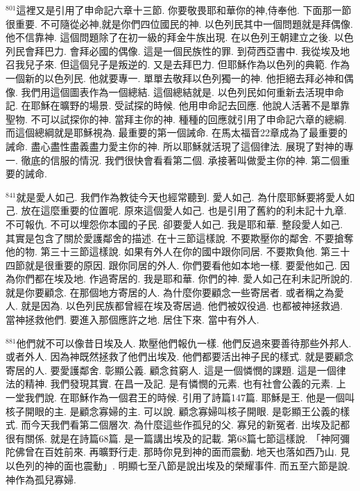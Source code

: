 \documentclass{book}
\begin{document}
$^{801}$這裡又是引用了申命記六章十三節.
你要敬畏耶和華你的神,侍奉他.
下面那一節很重要.
不可隨從必神,就是你們四位國民的神.
以色列民其中一個問題就是拜偶像.
他不信靠神.
這個問題除了在初一級的拜金牛族出現.
在以色列王朝建立之後.
以色列民會拜巴力.
會拜必國的偶像.
這是一個民族性的罪.
到荷西亞書中.
我從埃及地召我兒子來.
但這個兒子是叛逆的.
又是去拜巴力.
但耶穌作為以色列的典範.
作為一個新的以色列民.
他就要專一.
單單去敬拜以色列獨一的神.
他拒絕去拜必神和偶像.
我們用這個圖表作為一個總結.
這個總結就是.
以色列民如何重新去活現申命記.
在耶穌在曠野的場景.
受試探的時候.
他用申命記去回應.
他說人活著不是單靠聖物.
不可以試探你的神.
當拜主你的神.
種種的回應就引用了申命記六章的總綱.
而這個總綱就是耶穌視為.
最重要的第一個誡命.
在馬太福音22章成為了最重要的誡命.
盡心盡性盡義盡力愛主你的神.
所以耶穌就活現了這個律法.
展現了對神的專一.
徹底的信服的情況.
我們很快會看看第二個.
承接著叫做愛主你的神.
第二個重要的誡命.

$^{841}$就是愛人如己.
我們作為教徒今天也經常聽到.
愛人如己.
為什麼耶穌要將愛人如己.
放在這麼重要的位置呢.
原來這個愛人如己.
也是引用了舊約的利未記十九章.
不可報仇.
不可以埋怨你本國的子民.
卻要愛人如己.
我是耶和華.
整段愛人如己.
其實是包含了關於愛護鄰舍的描述.
在十三節這樣說.
不要欺壓你的鄰舍.
不要搶奪他的物.
第三十三節這樣說.
如果有外人在你的國中跟你同居.
不要欺負他.
第三十四節就是很重要的原因.
跟你同居的外人.
你們要看他如本地一樣.
要愛他如己.
因為你們都在埃及地.
作過寄居的.
我是耶和華.
你們的神.
愛人如己在利未記所說的.
就是你要顧念.
在那個地方寄居的人.
為什麼你要顧念一些寄居者.
或者稱之為愛人.
就是因為.
以色列民族都曾經在埃及寄居過.
他們被奴役過.
也都被神拯救過.
當神拯救他們.
要進入那個應許之地.
居住下來.
當中有外人.

$^{881}$他們就不可以像昔日埃及人.
欺壓他們報仇一樣.
他們反過來要善待那些外邦人.
或者外人.
因為神既然拯救了他們出埃及.
他們都要活出神子民的樣式.
就是要顧念寄居的人.
要愛護鄰舍.
彰顯公義.
顧念貧窮人.
這是一個憐憫的課題.
這是一個律法的精神.
我們發現其實.
在昌一及記.
是有憐憫的元素.
也有社會公義的元素.
上一堂我們說.
在耶穌作為一個君王的時候.
引用了詩篇147篇.
耶穌是王.
他是一個叫核子開眼的主.
是顧念寡婦的主.
可以說.
顧念寡婦叫核子開眼.
是彰顯王公義的樣式.
而今天我們看第二個層次.
為什麼這些作孤兒的父.
寡兒的新冤者.
出埃及記都很有關係.
就是在詩篇68篇.
是一篇講出埃及的記載.
第68篇七節這樣說.
「神阿彌陀佛曾在百姓前來.
再曠野行走.
那時你見到神的面而震動.
地天也落如西乃山.
見以色列的神的面也震動」.
明顯七至八節是說出埃及的榮耀事件.
而五至六節是說.
神作為孤兒寡婦.
\end{document}
